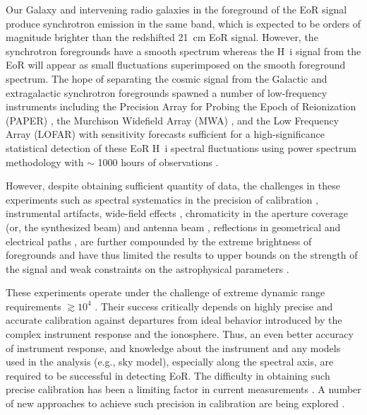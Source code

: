 \documentclass[
reprint,
superscriptaddress,
amsmath,
amssymb,
aps,
prd
]{revtex4-1}
\begin{document}
Our Galaxy and intervening radio galaxies in the foreground of the EoR signal produce synchrotron emission in the same band, which is expected to be orders of magnitude brighter than the redshifted 21~cm EoR signal. However, the synchrotron foregrounds have a smooth spectrum whereas the H~{\sc i} signal from the EoR will appear as small fluctuations superimposed on the smooth foreground spectrum. The hope of separating the cosmic signal from the Galactic and extragalactic synchrotron foregrounds spawned a number of low-frequency instruments including the Precision Array for Probing the Epoch of Reionization (PAPER) \cite{par10}, the Murchison Widefield Array (MWA) \cite{tin13}, and the Low Frequency Array (LOFAR) \cite{van13} with sensitivity forecasts sufficient for a high-significance statistical detection of these EoR H~{\sc i} spectral fluctuations using power spectrum methodology with $\sim$ 1000 hours of observations \cite{bea13,thy13}. 

However, despite obtaining sufficient quantity of data, the challenges in these experiments such as spectral systematics in the precision of calibration \cite{barry16}, instrumental artifacts, wide-field effects \cite{thy15a,thy15b}, chromaticity in the aperture coverage (or, the synthesized beam) and antenna beam \cite{thy16}, reflections in geometrical and electrical paths \cite{thy16}, are further compounded by the extreme brightness of foregrounds and have thus limited the results to upper bounds on the strength of the signal \cite{pac13,ali15,patil17} and weak constraints on the astrophysical parameters \cite{pob15}. 

These experiments operate under the challenge of extreme dynamic range requirements $\gtrsim 10^4$ \cite{dim02,ali08,ber09,ber10,dat10,gho12}. Their success critically depends on highly precise and accurate calibration against departures from ideal behavior introduced by the complex instrument response and the ionosphere. Thus, an even better accuracy of instrument response, and knowledge about the instrument and any models used in the analysis (e.g., sky model), especially along the spectral axis, are required to be successful in detecting EoR. The difficulty in obtaining such precise calibration \cite[for e.g.,][]{dat09,barry16,tro16} has been a limiting factor in current measurements \cite{ali15,patil16,patil17}. A number of new approaches to achieve such precision in calibration are being explored \cite{liu10,zhe14,sie17,dil17}.
\end{document}
